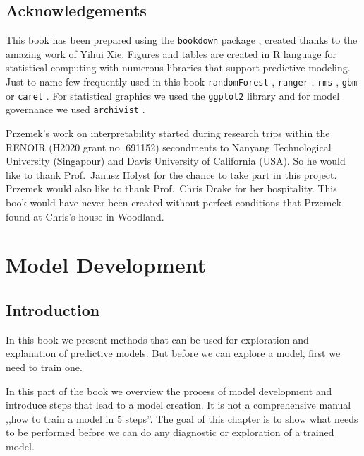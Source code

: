 \documentclass[12pt,]{krantz}
\begin{document}
\hypertarget{thanksto}{%
\subsection{Acknowledgements}\label{thanksto}}

This book has been prepared using the \texttt{bookdown} package \citep{R-bookdown}, created thanks to the amazing work of Yihui Xie.
Figures and tables are created in R language for statistical computing \citep{RcoreT} with numerous libraries that support predictive modeling. Just to name few frequently used in this book \texttt{randomForest} \citep{randomForestRNews}, \texttt{ranger} \citep{rangerRpackage}, \texttt{rms} \citep{rms}, \texttt{gbm} \citep{gbm} or \texttt{caret} \citep{caret}. For statistical graphics we used the \texttt{ggplot2} library \citep{ggplot2} and for model governance we used \texttt{archivist} \citep{archivist}.

Przemek's work on interpretability started during research trips within the RENOIR (H2020 grant no. 691152) secondments to Nanyang Technological University (Singapour) and Davis University of California (USA). So he would like to thank Prof.~Janusz Holyst for the chance to take part in this project. Przemek would also like to thank Prof.~Chris Drake for her hospitality. This book would have never been created without perfect conditions that Przemek found at Chris's house in Woodland.

\hypertarget{modelDevelopmentProcess}{%
\section{Model Development}\label{modelDevelopmentProcess}}

\hypertarget{MDPIntro}{%
\subsection{Introduction}\label{MDPIntro}}

In this book we present methods that can be used for exploration and explanation of predictive models. But before we can explore a model, first we need to train one.

In this part of the book we overview the process of model development and introduce steps that lead to a model creation. It is not a comprehensive manual ,,how to train a model in 5 steps''. The goal of this chapter is to show what needs to be performed before we can do any diagnostic or exploration of a trained model.
\end{document}

